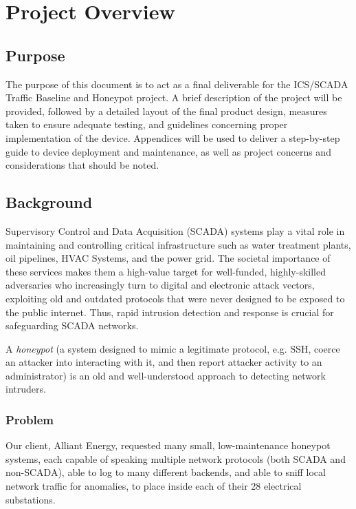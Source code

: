 \chapter{Project Overview}

\section{Purpose}

The purpose of this document is to act as a final deliverable for the ICS/SCADA Traffic Baseline and Honeypot project.  A brief description of the project will be provided, followed by a detailed layout of the final product design, measures taken to ensure adequate testing, and guidelines concerning proper implementation of the device. Appendices will be used to deliver a step-by-step guide to device deployment and maintenance, as well as project concerns and considerations that should be noted.

\section{Background}

Supervisory Control and Data Acquisition (SCADA) systems play a vital role in
maintaining and controlling critical infrastructure such as
water treatment plants, oil pipelines, HVAC Systems, and the power grid.
The societal importance of these services makes them a high-value target
for well-funded, highly-skilled adversaries who increasingly turn to digital
and electronic attack vectors, exploiting old and outdated protocols that
were never designed to be exposed to the public internet.
Thus, rapid intrusion detection and response is crucial for safeguarding
SCADA networks.

A \textit{honeypot} (a system designed to mimic a legitimate protocol, e.g.
SSH, coerce an attacker into interacting with it, and then report attacker
activity  to an administrator) is an old and well-understood approach to
detecting network intruders.

\subsection{Problem}

Our client, Alliant Energy, requested many small, low-maintenance honeypot
systems,
each capable of speaking multiple network protocols (both SCADA and non-SCADA),
able to log to many different backends, and able to sniff local network traffic
for anomalies, to place inside each of their 28 electrical substations.

